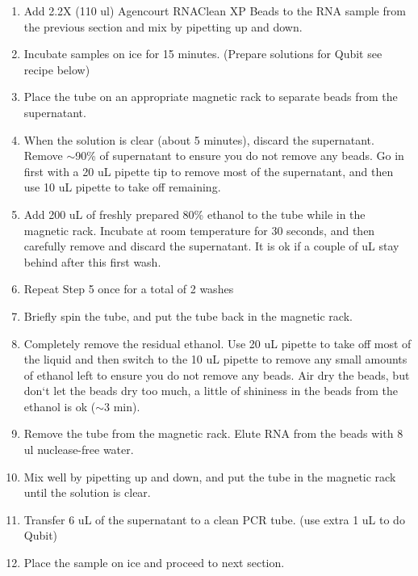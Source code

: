 \documentclass[11pt, oneside]{article}
\begin{document}
		\begin{enumerate}
			\item Add 2.2X (110 ul) Agencourt RNAClean XP Beads to the RNA sample from the previous section and mix by pipetting up and down.
			\item Incubate samples on ice for 15 minutes. (Prepare solutions for Qubit see recipe below)
			\item Place the tube on an appropriate magnetic rack to separate beads from the supernatant. 
			\item When the solution is clear (about 5 minutes), discard the supernatant. Remove $\sim$90\% of supernatant to ensure you do not remove 			any beads. Go in first with a 20 uL pipette tip to remove most of the supernatant, and then use 10 uL pipette to take off remaining. 
			\item Add 200 uL of freshly prepared 80\% ethanol to the tube while in the magnetic rack. Incubate at room temperature for 30 seconds, and 			then carefully remove and discard the supernatant. It is ok if a couple of uL stay behind after this first wash.
			\item Repeat Step 5 once for a total of 2 washes
			\item Briefly spin the tube, and put the tube back in the magnetic rack. 
			\item Completely remove the residual ethanol. Use 20 uL pipette to take off most of the liquid and then switch to the 10 uL pipette to remove 			any small amounts of ethanol left to ensure you do not remove any beads. Air dry the beads, but don`t let the beads dry too much, a little of 			shininess in the beads from the ethanol is ok ($\sim$3 min).  
			\item Remove the tube from the magnetic rack. Elute RNA from the beads with 8 ul nuclease-free water. 
			\item Mix well by pipetting up and down, and put the tube in the magnetic rack until the solution is clear.
			\item Transfer 6 uL of the supernatant to a clean PCR tube. (use extra 1 uL to do Qubit)
			\item Place the sample on ice and proceed to next section.	
		\end{enumerate}
		
		\vspace{3mm}
		
		
\end{document}
